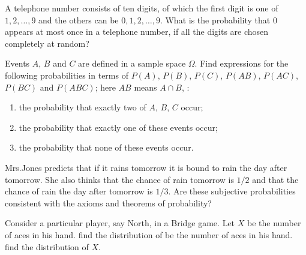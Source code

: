 \begin{problem}
  A telephone number consists of ten digits, of which the first digit is
  one of \(1,2,\dotsc,9\) and the others can be \(0,1,2,\dotsc,9\). What is
  the probability that \(0\) appears at most once in a telephone number, if
  all the digits are chosen completely at random?
\end{problem}
\begin{solution}
\end{solution}
\newpage

\begin{problem}
  Events \(A\), \(B\) and \(C\) are defined in a sample space
  \(\Omega\). Find expressions for the following probabilities in terms of
  \(P(A)\), \(P(B)\), \(P(C)\), \(P(AB)\), \(P(AC)\), \(P(BC)\) and
  \(P(ABC)\); here \(AB\) means \(A\cap B\), \etc{}:
  \begin{enumerate}[label=(\alph*)]
  \item the probability that exactly two of \(A\), \(B\), \(C\) occur;
  \item the probability that exactly one of these events occur;
  \item the probability that none of these events occur.
  \end{enumerate}
\end{problem}
\begin{solution}

\end{solution}
\newpage

\begin{problem}
  Mrs.\@ Jones predicts that if it rains tomorrow it is bound to rain the
  day after tomorrow. She also thinks that the chance of rain tomorrow is
  \(1/2\) and that the chance of rain the day after tomorrow is
  \(1/3\). Are these subjective probabilities consistent with the axioms
  and theorems of probability?
\end{problem}
\begin{solution}

\end{solution}
\newpage

\begin{problem}[Handout 1, \# 16]
  Consider a particular player, say North, in a Bridge game. Let \(X\) be
  the number of aces in his hand. find the distribution of be the number of
  aces in his hand. find the distribution of \(X\).
\end{problem}
\begin{solution}

\end{solution}
\newpage

